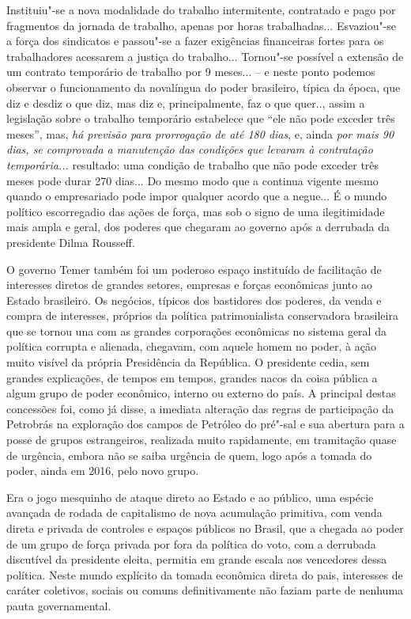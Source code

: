 Instituiu"-se a nova modalidade do trabalho intermitente, contratado e
pago por fragmentos da jornada de trabalho, apenas por horas
trabalhadas... Esvaziou"-se a força dos sindicatos e passou"-se a fazer
exigências financeiras fortes para os trabalhadores acessarem a justiça
do trabalho... Tornou"-se possível a extensão de um contrato temporário
de trabalho por 9 meses... -- e neste ponto podemos observar o
funcionamento da novalíngua%
do poder brasileiro, típica da época, que
diz e desdiz o que diz, mas diz e, principalmente, faz o que quer..,
assim a legislação sobre o trabalho temporário estabelece que ``ele não
pode exceder três meses'', mas, \emph{há previsão para prorrogação de
até 180 dias}, e, ainda \emph{por mais 90 dias, se comprovada a
manutenção das condições que levaram à contratação temporária...}
resultado: uma condição de trabalho que não pode exceder três meses pode
durar 270 dias... Do mesmo modo que a  continua vigente mesmo quando
o empresariado pode impor qualquer acordo que a negue... É o mundo
político escorregadio das ações de força, mas sob o signo de uma
ilegitimidade mais ampla e geral, dos poderes que chegaram ao governo
após a derrubada da presidente Dilma Rousseff.

O governo Temer também foi um poderoso espaço instituído de facilitação
de interesses diretos de grandes setores, empresas e forças econômicas
junto ao Estado brasileiro. Os negócios, típicos dos bastidores dos
poderes, da venda e compra de interesses, próprios da política
patrimonialista conservadora brasileira que se tornou una com as grandes
corporações econômicas no sistema geral da política corrupta e alienada,
chegavam, com aquele homem no poder, à ação muito visível da própria
Presidência da República. O presidente cedia, sem grandes explicações,
de tempos em tempos, grandes nacos da coisa pública a algum grupo de
poder econômico, interno ou externo do país. A principal destas
concessões foi, como já disse, a imediata alteração das regras de
participação da Petrobrás na exploração dos campos de Petróleo do
pré"-sal e sua abertura para a posse de grupos estrangeiros, realizada
muito rapidamente, em tramitação quase de urgência, embora não se saiba
urgência de quem, logo após a tomada do poder, ainda em 2016, pelo novo
grupo.

Era o jogo mesquinho de ataque direto ao Estado e ao público, uma
espécie avançada de rodada de capitalismo de nova acumulação primitiva,
com venda direta e privada de controles e espaços públicos no Brasil,
que a chegada ao poder de um grupo de força privada por fora da política
do voto, com a derrubada discutível da presidente eleita, permitia em
grande escala aos vencedores dessa política. Neste mundo explícito da
tomada econômica direta do pais, interesses de caráter coletivos,
sociais ou comuns definitivamente não faziam parte de nenhuma pauta
governamental.

